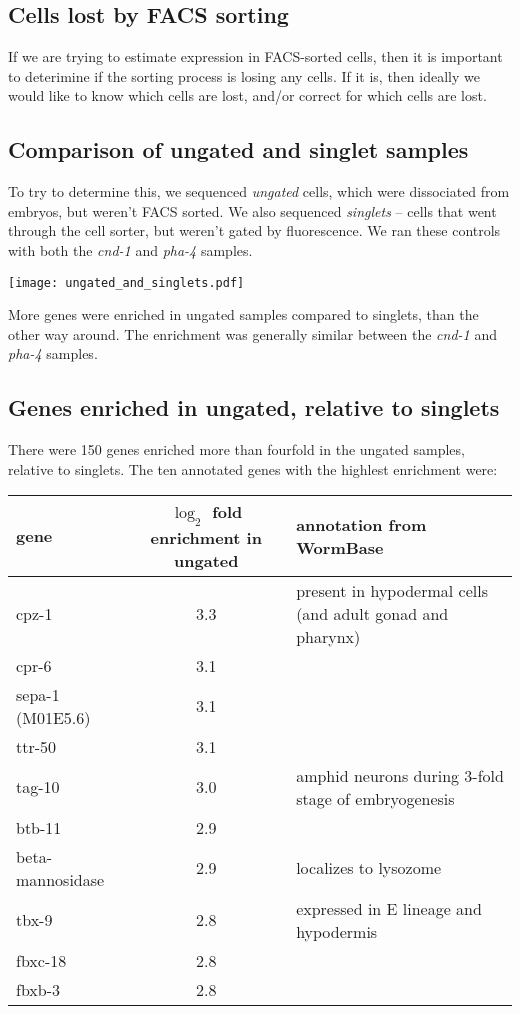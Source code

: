 \documentclass{article}
\begin{document}
\subsection*{Cells lost by FACS sorting}

If we are trying to estimate expression in FACS-sorted
cells, then it is important to deterimine if the sorting
process is losing any cells. If it is, then ideally
we would like to know which cells are lost, and/or
correct for which cells are lost.

\subsection*{Comparison of ungated and singlet samples}

To try to determine this,
we sequenced {\em ungated} cells, which were dissociated
from embryos, but weren't FACS sorted. We also sequenced
{\em singlets} -- cells that went through the cell sorter,
but weren't gated by fluorescence. We ran these controls
with both the {\em cnd-1} and {\em pha-4} samples.

\begin{center}
\texttt{[image: ungated\_and\_singlets.pdf]}
\end{center}

More genes were enriched in ungated samples compared to singlets,
than the other way around. The enrichment was generally similar
between the {\em cnd-1} and {\em pha-4} samples.

\subsection*{Genes enriched in ungated, relative to singlets}

There were 150 genes enriched more than fourfold in the ungated samples,
relative to singlets.
The ten annotated genes with the highlest enrichment were:

\begin{tabular}{lcl}
gene & $\log_2$ fold enrichment in ungated & annotation from WormBase \\
\hline
cpz-1 & 3.3 & present in hypodermal cells (and adult gonad and pharynx) \\
cpr-6 & 3.1 &  \\
sepa-1 (M01E5.6) & 3.1 &   \\
ttr-50 & 3.1 &  \\
tag-10 & 3.0 & amphid neurons during 3-fold stage of embryogenesis \\
btb-11 & 2.9 &  \\
beta-mannosidase & 2.9 & localizes to lysozome \\
tbx-9 & 2.8 & expressed in E lineage and hypodermis \\
fbxc-18 & 2.8 &  \\
fbxb-3 & 2.8 & \\
\end{tabular}
\end{document}
